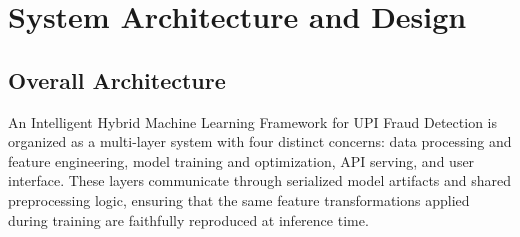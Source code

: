 \chapter{System Architecture and Design}

\section{Overall Architecture}

An Intelligent Hybrid Machine Learning Framework for UPI Fraud Detection is organized as a multi-layer system with four distinct concerns: data processing and feature engineering, model training and optimization, API serving, and user interface. These layers communicate through serialized model artifacts and shared preprocessing logic, ensuring that the same feature transformations applied during training are faithfully reproduced at inference time.

